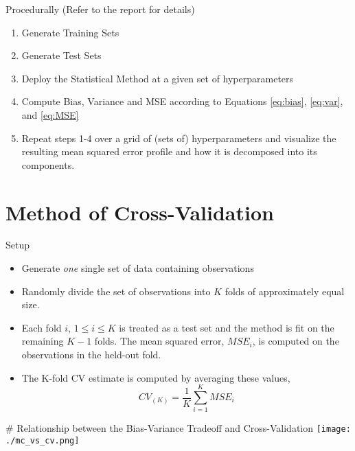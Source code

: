 \documentclass[
  ignorenonframetext,
]{beamer}
\providecommand{\tightlist}{%
  \setlength{\itemsep}{0pt}\setlength{\parskip}{0pt}}
\begin{document}
\begin{frame}{Procedurally}
\protect\hypertarget{procedurally}{}
(Refer to the report for details)

\begin{enumerate}
\item
  Generate Training Sets
\item
  Generate Test Sets
\item
  Deploy the Statistical Method at a given set of hyperparameters
\item
  Compute Bias, Variance and MSE according to Equations \eqref{eq:bias}, \eqref{eq:var}, and \eqref{eq:MSE}
\item
  Repeat steps 1-4 over a grid of (sets of) hyperparameters and visualize the resulting mean squared error profile and how it is decomposed into its components.
\end{enumerate}
\end{frame}

\hypertarget{method-of-cross-validation}{%
\section{Method of Cross-Validation}\label{method-of-cross-validation}}

\begin{frame}{Setup}
\protect\hypertarget{setup}{}
\begin{itemize}
\tightlist
\item
  Generate \emph{one} single set of data containing observations
\item
  Randomly divide the set of observations into \(K\) folds of approximately equal size.
\item
  Each fold \(i\), \(1 \le i \le K\) is treated as a test set and the method is fit on the remaining \(K - 1\) folds. The mean squared error, \(MSE_i\), is computed on the observations in the held-out fold.
\item
  The K-fold CV estimate is computed by averaging these values,
  \begin{equation}
  CV_{(K)} = \frac{1}{K}\sum_{i=1}^K MSE_i \label{eq:cv-mse}
  \end{equation}
\end{itemize}
\end{frame}

\begin{frame}{\# Relationship between the Bias-Variance Tradeoff and Cross-Validation}
\protect\hypertarget{relationship-between-the-bias-variance-tradeoff-and-cross-validation}{}
\texttt{[image: ./mc\_vs\_cv.png]}
\end{frame}
\end{document}
